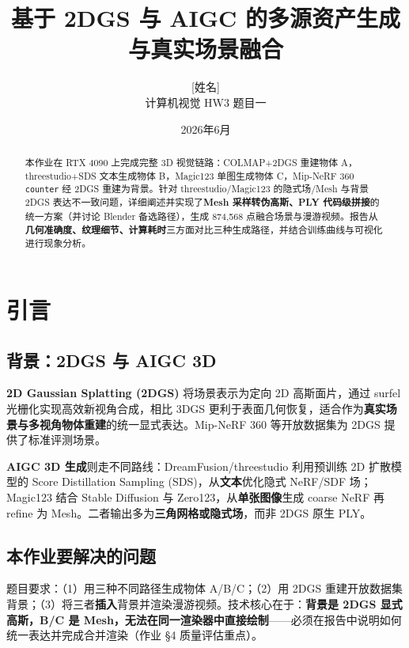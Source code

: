 \documentclass[11pt]{article}
\title{基于 2DGS 与 AIGC 的多源资产生成与真实场景融合}
\author{[姓名] \quad [学号] \\ 计算机视觉 HW3 题目一}
\date{2026年6月}
\begin{document}
\maketitle

\begin{abstract}
本作业在 RTX 4090 上完成完整 3D 视觉链路：COLMAP+2DGS 重建物体 A，threestudio+SDS 文本生成物体 B，Magic123 单图生成物体 C，Mip-NeRF 360 \texttt{counter} 经 2DGS 重建为背景。针对 threestudio/Magic123 的隐式场/Mesh 与背景 2DGS 表达不一致问题，详细阐述并实现了\textbf{Mesh 采样转伪高斯、PLY 代码级拼接}的统一方案（并讨论 Blender 备选路径），生成 874{,}568 点融合场景与漫游视频。报告从\textbf{几何准确度、纹理细节、计算耗时}三方面对比三种生成路径，并结合训练曲线与可视化进行现象分析。
\end{abstract}

\section{引言}

\subsection{背景：2DGS 与 AIGC 3D}
\textbf{2D Gaussian Splatting (2DGS)} 将场景表示为定向 2D 高斯面片，通过 surfel 光栅化实现高效新视角合成，相比 3DGS 更利于表面几何恢复，适合作为\textbf{真实场景与多视角物体重建}的统一显式表达。Mip-NeRF 360 等开放数据集为 2DGS 提供了标准评测场景。

\textbf{AIGC 3D 生成}则走不同路线：DreamFusion/threestudio 利用预训练 2D 扩散模型的 Score Distillation Sampling (SDS)，从\textbf{文本}优化隐式 NeRF/SDF 场；Magic123 结合 Stable Diffusion 与 Zero123，从\textbf{单张图像}生成 coarse NeRF 再 refine 为 Mesh。二者输出多为\textbf{三角网格或隐式场}，而非 2DGS 原生 PLY。

\subsection{本作业要解决的问题}
题目要求：（1）用三种不同路径生成物体 A/B/C；（2）用 2DGS 重建开放数据集背景；（3）将三者\textbf{插入}背景并渲染漫游视频。技术核心在于：\textbf{背景是 2DGS 显式高斯，B/C 是 Mesh，无法在同一渲染器中直接绘制}——必须在报告中说明如何统一表达并完成合并渲染（作业 §4 质量评估重点）。

\end{document}
